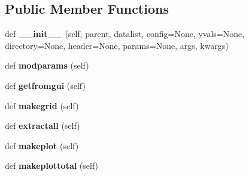 \subsection*{Public Member Functions}
\begin{DoxyCompactItemize}
\item 
\hypertarget{class_uni_dec_1_1unidec__modules_1_1_extract2_d_1_1_extract2_d_plot_a6fc950dc65de0e2a16e3000264bfa23e}{}def {\bfseries \+\_\+\+\_\+init\+\_\+\+\_\+} (self, parent, datalist, config=None, yvals=None, directory=None, header=None, params=None, args, kwargs)\label{class_uni_dec_1_1unidec__modules_1_1_extract2_d_1_1_extract2_d_plot_a6fc950dc65de0e2a16e3000264bfa23e}

\item 
\hypertarget{class_uni_dec_1_1unidec__modules_1_1_extract2_d_1_1_extract2_d_plot_a106a9d1dd116aa0e279e73719b0c6972}{}def {\bfseries modparams} (self)\label{class_uni_dec_1_1unidec__modules_1_1_extract2_d_1_1_extract2_d_plot_a106a9d1dd116aa0e279e73719b0c6972}

\item 
\hypertarget{class_uni_dec_1_1unidec__modules_1_1_extract2_d_1_1_extract2_d_plot_a9d0fc6253f6e451c31001496e4e4f3af}{}def {\bfseries getfromgui} (self)\label{class_uni_dec_1_1unidec__modules_1_1_extract2_d_1_1_extract2_d_plot_a9d0fc6253f6e451c31001496e4e4f3af}

\item 
\hypertarget{class_uni_dec_1_1unidec__modules_1_1_extract2_d_1_1_extract2_d_plot_a25cc8faf288ecfca46b719a7e08d3f1b}{}def {\bfseries makegrid} (self)\label{class_uni_dec_1_1unidec__modules_1_1_extract2_d_1_1_extract2_d_plot_a25cc8faf288ecfca46b719a7e08d3f1b}

\item 
\hypertarget{class_uni_dec_1_1unidec__modules_1_1_extract2_d_1_1_extract2_d_plot_a82b2552cc68144075885d3ef8ea34470}{}def {\bfseries extractall} (self)\label{class_uni_dec_1_1unidec__modules_1_1_extract2_d_1_1_extract2_d_plot_a82b2552cc68144075885d3ef8ea34470}

\item 
\hypertarget{class_uni_dec_1_1unidec__modules_1_1_extract2_d_1_1_extract2_d_plot_a0318f7ce9ea336b3eec6212891af1236}{}def {\bfseries makeplot} (self)\label{class_uni_dec_1_1unidec__modules_1_1_extract2_d_1_1_extract2_d_plot_a0318f7ce9ea336b3eec6212891af1236}

\item 
\hypertarget{class_uni_dec_1_1unidec__modules_1_1_extract2_d_1_1_extract2_d_plot_a900dd84589adb38b22f3377eea9756f3}{}def {\bfseries makeplottotal} (self)\label{class_uni_dec_1_1unidec__modules_1_1_extract2_d_1_1_extract2_d_plot_a900dd84589adb38b22f3377eea9756f3}


\end{DoxyCompactItemize}
